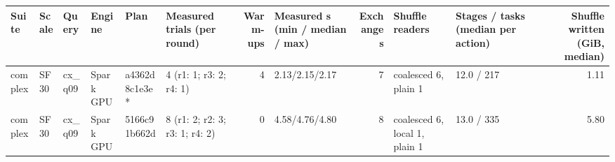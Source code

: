 \begin{longtable}{llllllrlrllr}
\toprule
Suite & Scale & Query & Engine & Plan & Measured trials (per round) & Warm-ups & Measured s (min / median / max) & Exchanges & Shuffle readers & Stages / tasks (median per action) & Shuffle written (GiB, median) \\
\midrule
\endhead
\bottomrule
\endfoot
complex & SF30 & cx\_q09 & Spark GPU & a4362d8c1e3e * & 4 (r1: 1; r3: 2; r4: 1) & 4 & 2.13/2.15/2.17 & 7 & coalesced 6, plain 1 & 12.0 / 217 & 1.11 \\
complex & SF30 & cx\_q09 & Spark GPU & 5166c91b662d & 8 (r1: 2; r2: 3; r3: 1; r4: 2) & 0 & 4.58/4.76/4.80 & 8 & coalesced 6, local 1, plain 1 & 13.0 / 335 & 5.80 \\
\end{longtable}
